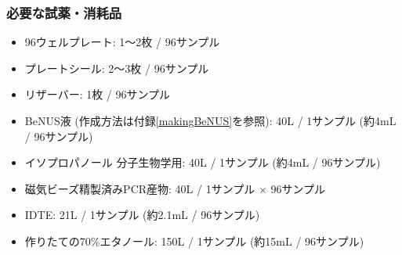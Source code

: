 \documentclass[titlepage,10pt,a4paper,uplatex]{jsbook}
\begin{document}
\subsubsection{必要な試薬・消耗品}
\begin{itemize}
\item 96ウェルプレート: 1～2枚 / 96サンプル
\item プレートシール: 2～3枚 / 96サンプル
\item リザーバー: 1枚 / 96サンプル
\item BeNUS液 (作成方法は付録\ref{makingBeNUS}を参照): 40{\textmu}L / 1サンプル (約4mL / 96サンプル)
\item イソプロパノール 分子生物学用: 40{\textmu}L / 1サンプル (約4mL / 96サンプル)
\item 磁気ビーズ精製済みPCR産物: 40{\textmu}L / 1サンプル × 96サンプル
\item IDTE: 21{\textmu}L / 1サンプル (約2.1mL / 96サンプル)
\item 作りたての70\%エタノール: 150{\textmu}L / 1サンプル (約15mL / 96サンプル)
\end{itemize}
\end{document}
